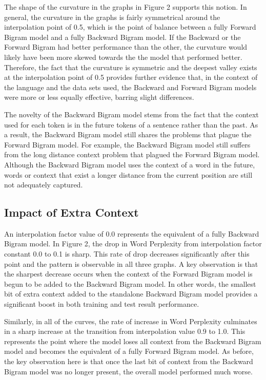 \documentclass{article} %
\begin{document}
The shape of the curvature in the graphs in Figure 2 supports this notion. In general, the curvature in the graphs is fairly symmetrical around the interpolation point of 0.5, which is the point of balance between a fully Forward Bigram model and a fully Backward Bigram model. If the Backward or the Forward Bigram had better performance than the other, the curvature would likely have been more skewed towards the the model that performed better. Therefore, the fact that the curvature is symmetric and the deepest valley exists at the interpolation point of 0.5 provides further evidence that, in the context of the language and the data sets used, the Backward and Forward Bigram models were more or less equally effective, barring slight differences.

The novelty of the Backward Bigram model stems from the fact that the context used for each token is in the future tokens of a sentence rather than the past. As a result, the Backward Bigram model still shares the problems that plague the Forward Bigram model. For example, the Backward Bigram model still suffers from the long distance context problem that plagued the Forward Bigram model. Although the Backward Bigram model uses the context of a word in the future, words or context that exist a longer distance from the current position are still not adequately captured. 

\subsection{Impact of Extra Context}

An interpolation factor value of 0.0 represents the equivalent of a fully Backward Bigram model. In Figure 2, the drop in Word Perplexity from interpolation factor constant 0.0 to 0.1 is sharp. This rate of drop decreases significantly after this point and the pattern is observable in all three graphs. A key observation is that the sharpest decrease occurs when the context of the Forward Bigram model is begun to be added to the Backward Bigram model. In other words, the smallest bit of extra context added to the standalone Backward Bigram model provides a significant boost in both training and test result performance.

Similarly, in all of the curves, the rate of increase in Word Perplexity culminates in a sharp increase at the transition from interpolation value 0.9 to 1.0. This represents the point where the model loses all context from the Backward Bigram model and becomes the equivalent of a fully Forward Bigram model. As before, the key observation here is that once the last bit of context from the Backward Bigram model was no longer present, the overall model performed much worse.
\end{document}
